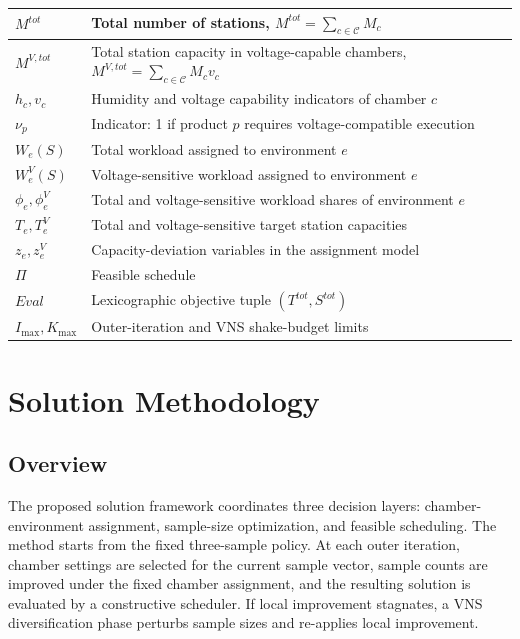\documentclass[11pt]{article}
\begin{document}
\begin{table}[H]
\begin{tabular}{|l|l|}
\(M^{tot}\) & Total number of stations, \(M^{tot}=\sum_{c\in\mathcal{C}}M_c\) \\ \hline
\(M^{V,tot}\) & Total station capacity in voltage-capable chambers, \(M^{V,tot}=\sum_{c\in\mathcal{C}}M_cv_c\) \\ \hline
\(h_c,v_c\) & Humidity and voltage capability indicators of chamber \(c\) \\ \hline
\(\nu_p\) & Indicator: 1 if product \(p\) requires voltage-compatible execution \\ \hline
\(W_e(S)\) & Total workload assigned to environment \(e\) \\ \hline
\(W_e^V(S)\) & Voltage-sensitive workload assigned to environment \(e\) \\ \hline
\(\phi_e,\phi_e^V\) & Total and voltage-sensitive workload shares of environment \(e\) \\ \hline
\(T_e,T_e^V\) & Total and voltage-sensitive target station capacities \\ \hline
\(z_e,z_e^V\) & Capacity-deviation variables in the assignment model \\ \hline
\(\Pi\) & Feasible schedule \\ \hline
\(Eval\) & Lexicographic objective tuple \((T^{tot},S^{tot})\) \\ \hline
\(I_{\max},K_{\max}\) & Outer-iteration and VNS shake-budget limits \\ \hline
\end{tabular}
\end{table}

\section{Solution Methodology}
\label{sec:solution}

\subsection{Overview}
\label{subsec:framework}

The proposed solution framework coordinates three decision layers: chamber-environment assignment, sample-size optimization, and feasible scheduling. The method starts from the fixed three-sample policy. At each outer iteration, chamber settings are selected for the current sample vector, sample counts are improved under the fixed chamber assignment, and the resulting solution is evaluated by a constructive scheduler. If local improvement stagnates, a VNS diversification phase perturbs sample sizes and re-applies local improvement.
\end{document}
